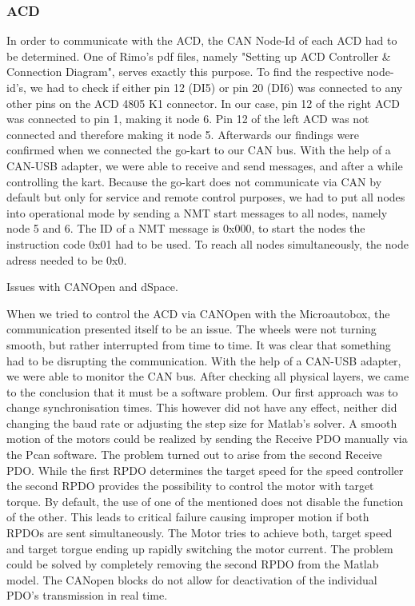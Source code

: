 \subsubsection{ACD}


In order to communicate with the ACD, the CAN Node-Id of each ACD had to be determined. One of Rimo's pdf files, namely "Setting up ACD Controller \& Connection Diagram", serves exactly this purpose. 
To find the respective node-id's, we had to check if either pin 12 (DI5) or pin 20 (DI6) was connected to any other pins on the ACD 4805 K1 connector. In our case, pin 12 of the right ACD was connected to pin 1, making it node 6. Pin 12 of the left ACD was not connected and therefore making it node 5. Afterwards our findings were confirmed when we connected the go-kart to our CAN bus. With the help of a CAN-USB adapter, we were able to receive and send messages, and after a while controlling the kart.
Because the go-kart does not communicate via CAN by default but only for service and remote control purposes, we had to put all nodes into operational mode by sending a NMT start messages to all nodes, namely node 5 and 6.
The ID of a NMT message is 0x000, to start the nodes the instruction code 0x01 had to be used. To reach all nodes simultaneously, the node adress needed to be 0x0. 

Issues with CANOpen and dSpace. 

When we tried to control the ACD via CANOpen with the Microautobox, the communication presented itself to be an issue. The wheels were not turning smooth, but rather interrupted from time to time. It was clear that something had to be disrupting the communication.
With the help of a CAN-USB adapter, we were able to monitor the CAN bus. After checking all physical layers, we came to the conclusion that it must be a software problem. Our first approach was to change synchronisation times. This however did not have any effect, neither did changing the baud rate or adjusting the step size for Matlab's solver.
A smooth motion of the motors could be realized by sending the Receive PDO manually via the Pcan software. The problem turned out to arise from the second Receive PDO. While the first RPDO determines the target speed for the speed controller the second RPDO provides the possibility to control the motor with target torque. By default, the use of one of the mentioned does not disable the function of the other. This leads to critical failure  causing improper motion if both RPDOs are sent simultaneously. The Motor tries to achieve both, target speed and target torgue ending up rapidly switching the motor current. The problem could be solved by completely removing the second RPDO from the Matlab model. The CANopen blocks do not allow for deactivation of the individual PDO's transmission in real time.


